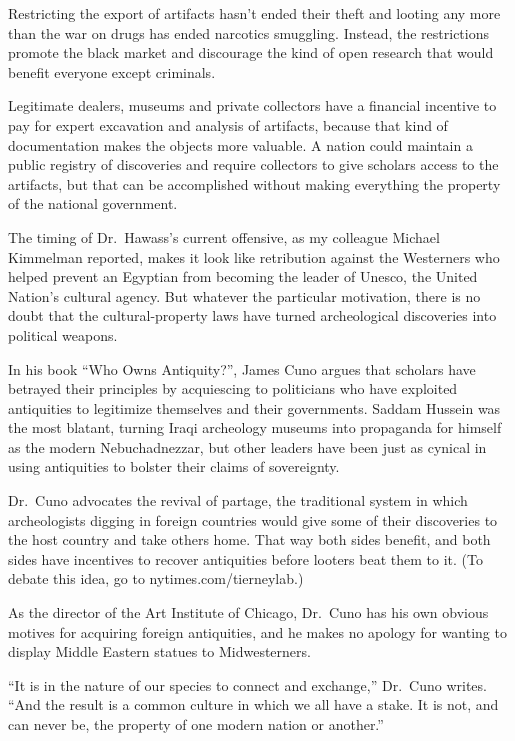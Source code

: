 ﻿\documentclass[12pt]{article}
\begin{document}
Restricting the export of artifacts hasn't ended their theft and looting any more than the war on
drugs has ended narcotics smuggling. Instead, the restrictions promote the black market and
discourage the kind of open research that would benefit everyone except criminals.

Legitimate dealers, museums and private collectors have a financial incentive to pay for expert
excavation and analysis of artifacts, because that kind of documentation makes the objects more
valuable. A nation could maintain a public registry of discoveries and require collectors to give
scholars access to the artifacts, but that can be accomplished without making everything the
property of the national government.

The timing of Dr.~Hawass's current offensive, as my colleague Michael Kimmelman reported, makes it
look like retribution against the Westerners who helped prevent an Egyptian from becoming the leader
of Unesco, the United Nation's cultural agency. But whatever the particular motivation, there is no
doubt that the cultural-property laws have turned archeological discoveries into political weapons.

In his book ``Who Owns Antiquity?'', James Cuno argues that scholars have betrayed their principles
by acquiescing to politicians who have exploited antiquities to legitimize themselves and their
governments. Saddam Hussein was the most blatant, turning Iraqi archeology museums into propaganda
for himself as the modern Nebuchadnezzar, but other leaders have been just as cynical in using
antiquities to bolster their claims of sovereignty.

Dr.~Cuno advocates the revival of partage, the traditional system in which archeologists digging in
foreign countries would give some of their discoveries to the host country and take others home.
That way both sides benefit, and both sides have incentives to recover antiquities before looters
beat them to it. (To debate this idea, go to nytimes.com/tierneylab.)

As the director of the Art Institute of Chicago, Dr.~Cuno has his own obvious motives for acquiring
foreign antiquities, and he makes no apology for wanting to display Middle Eastern statues to
Midwesterners.

``It is in the nature of our species to connect and exchange,'' Dr.~Cuno writes. ``And the result is
a common culture in which we all have a stake. It is not, and can never be, the property of one
modern nation or another.''
\end{document}
